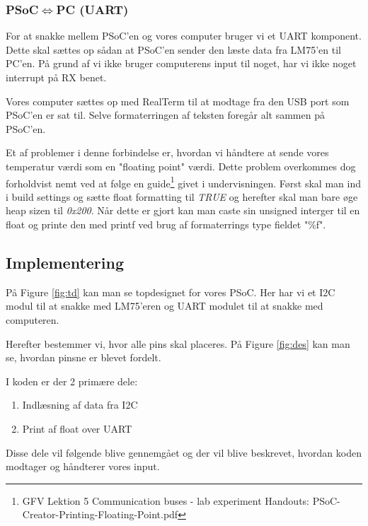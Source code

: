 \documentclass[../main.tex]{subfiles}
\begin{document}
\subsubsection{PSoC$\iff$PC (UART)}
For at snakke mellem PSoC'en og vores computer bruger vi et UART komponent. Dette skal sættes op sådan at PSoC'en sender den læste data fra LM75'en til PC'en.
På grund af vi ikke bruger computerens input til noget, har vi ikke noget interrupt på RX benet.

Vores computer sættes op med RealTerm til at modtage fra den USB port som PSoC'en er sat til.
Selve formaterringen af teksten foregår alt sammen på PSoC'en.

Et af problemer i denne forbindelse er, hvordan vi håndtere at sende vores temperatur værdi som en "floating point" værdi.
Dette problem overkommes dog forholdvist nemt ved at følge en guide\footnote{GFV Lektion 5 Communication buses - lab experiment Handouts: PSoC-Creator-Printing-Floating-Point.pdf} givet i undervisningen.
Først skal man ind i build settings og sætte float formatting til \textit{TRUE} og herefter skal man bare øge heap sizen til \textit{0x200}.
Når dette er gjort kan man caste sin unsigned interger til en float og printe den med printf ved brug af formaterrings type fieldet "\%f".

\subsection{Implementering}
På Figure \ref{fig:td} kan man se topdesignet for vores PSoC. Her har vi et I2C modul til at snakke med LM75'eren og UART modulet til at snakke med computeren.


Herefter bestemmer vi, hvor alle pins skal placeres. På Figure \ref{fig:des} kan man se, hvordan pinsne er blevet fordelt.

I koden er der 2 primære dele:
\begin{enumerate}
    \item Indlæsning af data fra I2C
    \item Print af float over UART
\end{enumerate}
Disse dele vil følgende blive gennemgået og der vil blive beskrevet, hvordan koden modtager og håndterer vores input.
\end{document}
